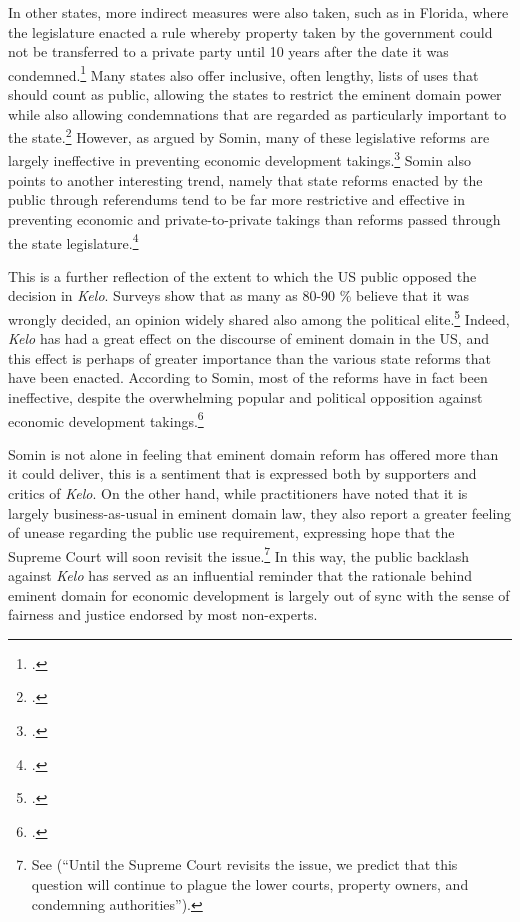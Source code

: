 In other states, more indirect measures were also taken, such as in Florida, where the legislature enacted a rule whereby property taken by the government could not be transferred to a private party until 10 years after the date it was condemned.\footcite[809]{eagle08} Many states also offer inclusive, often lengthy, lists of uses that should count as public, allowing the states to restrict the eminent domain power while also allowing condemnations that are regarded as particularly important to the state.\footcite[804]{eagle08}
However, as argued by Somin, many of these legislative reforms are largely ineffective in preventing economic development takings.\footcite[2120]{somin09} Somin also points to another interesting trend, namely that state reforms enacted by the public through referendums tend to be far more restrictive and effective in preventing economic and private-to-private takings than reforms passed through the state legislature.\footcite[2143]{somin09} 

This is a further reflection of the extent to which the US public opposed the decision in {\it Kelo}. Surveys show that as many as 80-90 \% believe that it was wrongly decided, an opinion widely shared also among the political elite.\footcite[2109]{somin09} Indeed, {\it Kelo} has had a great effect on the discourse of eminent domain in the US, and this effect is perhaps of greater importance than the various state reforms that have been enacted. According to Somin, most of the reforms have in fact been ineffective, despite the overwhelming popular and political opposition against economic development takings.\footcite[2170-2171]{somin09} 

Somin is not alone in feeling that eminent domain reform has offered more than it could deliver, this is a sentiment that is expressed both by supporters and critics of {\it Kelo}. On the other hand, while practitioners have noted that it is largely business-as-usual in eminent domain law, they also report a greater feeling of unease regarding the public use requirement, expressing hope that the Supreme Court will soon revisit the issue.\footnote{See \cite{murakami13} (``Until the Supreme Court revisits the issue, we predict that this question will continue to plague the lower courts, property owners, and condemning authorities'').} In this way, the public backlash against {\it Kelo} has served as an influential reminder that the rationale behind eminent domain for economic development is largely out of sync with the sense of fairness and justice endorsed by most non-experts. 

